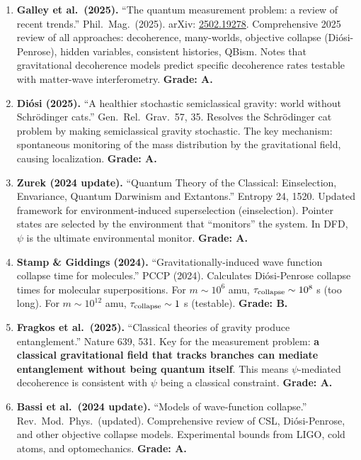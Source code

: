\documentclass[11pt,a4paper]{article}
\begin{document}
\begin{enumerate}
\item \textbf{Galley et al.\ (2025).} ``The quantum measurement problem: a review of recent trends.'' Phil.\ Mag.\ (2025). arXiv: \href{https://arxiv.org/abs/2502.19278}{2502.19278}. Comprehensive 2025 review of all approaches: decoherence, many-worlds, objective collapse (Di\'osi-Penrose), hidden variables, consistent histories, QBism. Notes that gravitational decoherence models predict specific decoherence rates testable with matter-wave interferometry. \textbf{Grade: A.}

\item \textbf{Di\'osi (2025).} ``A healthier stochastic semiclassical gravity: world without Schr\"odinger cats.'' Gen.\ Rel.\ Grav.\ 57, 35. Resolves the Schr\"odinger cat problem by making semiclassical gravity stochastic. The key mechanism: spontaneous monitoring of the mass distribution by the gravitational field, causing localization. \textbf{Grade: A.}

\item \textbf{Zurek (2024 update).} ``Quantum Theory of the Classical: Einselection, Envariance, Quantum Darwinism and Extantons.'' Entropy 24, 1520. Updated framework for environment-induced superselection (einselection). Pointer states are selected by the environment that ``monitors'' the system. In DFD, $\psi$ is the ultimate environmental monitor. \textbf{Grade: A.}

\item \textbf{Stamp \& Giddings (2024).} ``Gravitationally-induced wave function collapse time for molecules.'' PCCP (2024). Calculates Di\'osi-Penrose collapse times for molecular superpositions. For $m \sim 10^6$ amu, $\tau_{\rm collapse} \sim 10^8$ s (too long). For $m \sim 10^{12}$ amu, $\tau_{\rm collapse} \sim 1$ s (testable). \textbf{Grade: B.}

\item \textbf{Fragkos et al.\ (2025).} ``Classical theories of gravity produce entanglement.'' Nature 639, 531. Key for the measurement problem: \textbf{a classical gravitational field that tracks branches can mediate entanglement without being quantum itself}. This means $\psi$-mediated decoherence is consistent with $\psi$ being a classical constraint. \textbf{Grade: A.}

\item \textbf{Bassi et al.\ (2024 update).} ``Models of wave-function collapse.'' Rev.\ Mod.\ Phys.\ (updated). Comprehensive review of CSL, Di\'osi-Penrose, and other objective collapse models. Experimental bounds from LIGO, cold atoms, and optomechanics. \textbf{Grade: A.}
\end{enumerate}
\end{document}
